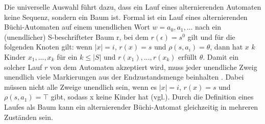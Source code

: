 Die universelle Auswahl führt dazu, dass ein Lauf eines alternierenden Automaten keine Sequenz, sondern ein Baum ist. Formal ist ein Lauf eines alternierenden Büchi-Automaten auf einem unendlichen Wort $w=a_0, a_1,...$ nach \cite{vardi+96} ein (unendlicher) S-beschrifteter Baum r, bei dem $r(\epsilon)=s^0$ gilt und für die folgenden Knoten gilt: wenn $|x|=i$, $r(x)=s$ und $\rho(s,a_i)=\theta$, dann hat $x$ $k$ Kinder $x_1,...,x_k$ für ein $k\leq|S|$ und ${r(x_1),...,r(x_k)}$ erfüllt $\theta$. Damit ein solcher Lauf $r$ von dem Automaten akzeptiert wird, muss jeder unendliche Zweig unendlich viele Markierungen aus der Endzustandsmenge beinhalten \cite{vardi+96}. Dabei müssen nicht alle Zweige unendlich sein, wenn es $|x|=i$, $r(x)=s$ und $\rho(s,a_1) = \top$ gibt, sodass x keine Kinder hat (vgl.\cite{vardi+96}). Durch die Definition eines Laufes als Baum kann ein alternierender Büchi-Automat gleichzeitig in mehreren Zuständen sein. 


